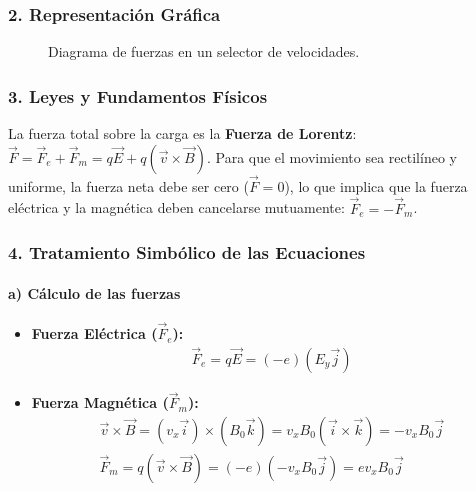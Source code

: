 \subsubsection*{2. Representación Gráfica}
\begin{figure}[H]
    \centering
    \caption{Diagrama de fuerzas en un selector de velocidades.}
\end{figure}

\subsubsection*{3. Leyes y Fundamentos Físicos}
La fuerza total sobre la carga es la \textbf{Fuerza de Lorentz}: $\vec{F} = \vec{F}_e + \vec{F}_m = q\vec{E} + q(\vec{v} \times \vec{B})$.
Para que el movimiento sea rectilíneo y uniforme, la fuerza neta debe ser cero ($\vec{F}=0$), lo que implica que la fuerza eléctrica y la magnética deben cancelarse mutuamente: $\vec{F}_e = -\vec{F}_m$.

\subsubsection*{4. Tratamiento Simbólico de las Ecuaciones}
\paragraph{a) Cálculo de las fuerzas}
\begin{itemize}
    \item \textbf{Fuerza Eléctrica ($\vec{F}_e$):}
    \begin{gather}
        \vec{F}_e = q\vec{E} = (-e)(E_y \vec{j})
    \end{gather}
    \item \textbf{Fuerza Magnética ($\vec{F}_m$):}
    \begin{gather}
        \vec{v} \times \vec{B} = (v_x \vec{i}) \times (B_0 \vec{k}) = v_x B_0 (\vec{i}\times\vec{k}) = -v_x B_0 \vec{j} \\
        \vec{F}_m = q(\vec{v} \times \vec{B}) = (-e)(-v_x B_0 \vec{j}) = e v_x B_0 \vec{j}
    \end{gather}
\end{itemize}

